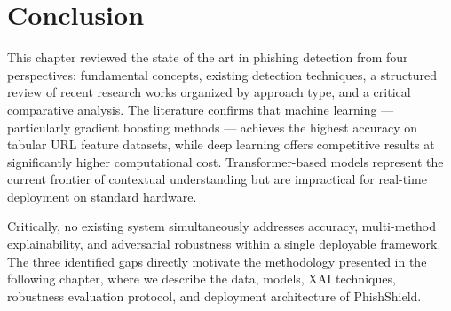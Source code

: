 \section*{Conclusion}

This chapter reviewed the state of the art in phishing detection from four perspectives: fundamental concepts, existing detection techniques, a structured review of recent research works organized by approach type, and a critical comparative analysis. The literature confirms that machine learning — particularly gradient boosting methods — achieves the highest accuracy on tabular URL feature datasets, while deep learning offers competitive results at significantly higher computational cost. Transformer-based models represent the current frontier of contextual understanding but are impractical for real-time deployment on standard hardware.

Critically, no existing system simultaneously addresses accuracy, multi-method explainability, and adversarial robustness within a single deployable framework. The three identified gaps directly motivate the methodology presented in the following chapter, where we describe the data, models, XAI techniques, robustness evaluation protocol, and deployment architecture of PhishShield.
